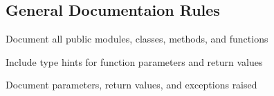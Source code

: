 \subsection{General Documentaion Rules}

Document all public modules, classes, methods, and functions

Include type hints for function parameters and return values

Document parameters, return values, and exceptions raised